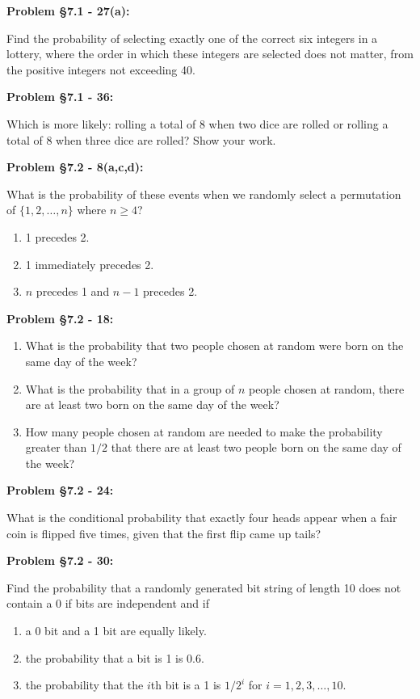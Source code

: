 \documentclass{article}
\newenvironment{problem}[1]
    {\begin{mdframed}[default]
    \textbf{Problem #1:}
    }
    {\end{mdframed}
    }
\begin{document}
\begin{problem}{\S 7.1 - 27(a)}
Find the probability of selecting exactly one of the correct six integers in a lottery, where the order in which these integers are selected does not matter, from the positive integers not exceeding 40.
\end{problem}

\begin{problem}{\S 7.1 - 36}
Which is more likely: rolling a total of 8 when two dice are rolled or rolling a total of 8 when three dice are rolled? Show your work.
\end{problem}

\begin{problem}{\S 7.2 - 8(a,c,d)}
What is the probability of these events when we randomly select a permutation of $\{ 1, 2, \dots, n \}$ where $n \geq 4$?
\begin{enumerate}
    \item[(a)] 1 precedes 2.
    \item[(c)] 1 immediately precedes 2.
    \item[(d)] $n$ precedes 1 and $n-1$ precedes 2.
\end{enumerate}
\end{problem}

\begin{problem}{\S 7.2 - 18}
\begin{enumerate}
    \item[(a)] What is the probability that two people chosen at random were born on the same day of the week?
    \item[(b)] What is the probability that in a group of $n$ people chosen at random, there are at least two born on the same day of the week?
    \item[(c)] How many people chosen at random are needed to make the probability greater than $1/2$ that there are at least two people born on the same day of the week?
\end{enumerate}
\end{problem}

\begin{problem}{\S 7.2 - 24}
What is the conditional probability that exactly four heads appear when a fair coin is flipped five times, given that the first flip came up tails?
\end{problem}

\begin{problem}{\S 7.2 - 30}
Find the probability that a randomly generated bit string of length 10 does not contain a 0 if bits are independent and if
\begin{enumerate}
    \item[(a)] a 0 bit and a 1 bit are equally likely.
    \item[(b)] the probability that a bit is 1 is 0.6.
    \item[(c)] the probability that the $i$th bit is a 1 is $1/2^i$ for $i = 1, 2, 3, \dots, 10$.
\end{enumerate}
\end{problem}
\end{document}
